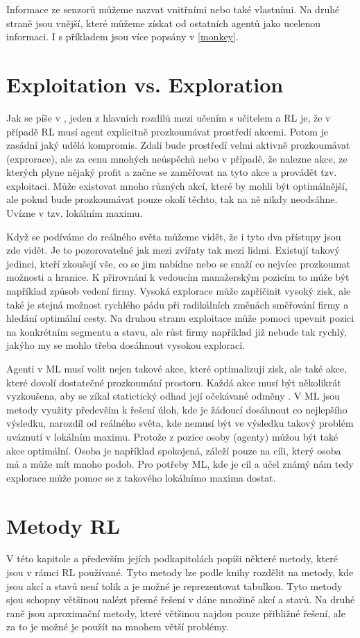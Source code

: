 \documentclass{article}
\begin{document}
Informace ze senzorů můžeme nazvat vnitřními nebo také vlastními. Na druhé straně jsou vnější, které můžeme získat od ostatních agentů jako ucelenou informaci. I s příkladem jsou více popsány v \ref{monkey}.


\section{Exploitation vs. Exploration}
Jak se píše v \cite{kaelbling1996reinforcement}, jeden z hlavních rozdílů mezi učením s učitelem a RL je, že v případě RL musí agent explicitně prozkoumávat prostředí akcemi. Potom je zasádní jaký udělá kompromis. Zdali bude prostředí velmi aktivně prozkoumávat (exprorace), ale za cenu mnohých neúspěchů nebo v případě, že nalezne akce, ze kterých plyne nějaký profit a začne se zaměřovat na tyto akce a provádět tzv. exploitaci. Může existovat mnoho různých akcí, které by mohli být optimálnější, ale pokud bude prozkoumávat pouze okolí těchto, tak na ně nikdy neodsáhne. Uvízne v tzv. lokálním maximu.

Když se podíváme do reálného světa můžeme vidět, že i tyto dva přístupy jsou zde vidět. Je to pozorovatelné jak mezi zvířaty tak mezi lidmi. Existují takový jedinci, kteří zkoušejí vše, co se jim nabídne nebo se snaží co nejvíce prozkoumat možnosti a hranice. K přirovnání k vedoucím manažerským pozicím to může být například způsob vedení firmy. Vysoká explorace může zapříčinit vysoký zisk, ale také je stejná možnost rychlého pádu při radikálních změnách směřování firmy a hledání optimální cesty. Na druhou stranu exploitace může pomoci upevnit pozici na konkrétním segmentu a stavu, ale růst firmy například již nebude tak rychlý, jakýho my se mohlo třeba dosáhnout vysokou explorací.

Agenti v ML musí volit nejen takové akce, které optimalizují zisk, ale také akce, které dovolí dostatečné prozkoumání prostoru. Každá akce musí být několikrát vyzkoušena, aby se zíkal statictický odhad její očekávané odměny \cite{sutton1998introduction}. V ML jsou metody využity především k řešení úloh, kde je žádoucí dosáhnout co nejlepšího výsledku, narozdíl od reálného světa, kde nemusí být ve výsledku takový problém uváznutí v lokálním maximu. Protože z pozice osoby (agenty) můžou být také akce optimální. Osoba je například spokojená, záleží pouze na cíli, který osoba má a může mít mnoho podob. Pro potřeby ML, kde je cíl a učel známý nám tedy explorace může pomoc se z takového lokálnímo maxima dostat. 


\section{Metody RL}
V této kapitole a především jejích podkapitolách popíši některé metody, které jsou v rámci RL používané. Tyto metody lze podle knihy \cite{sutton1998introduction} rozdělit na metody, kde jsou akcí a stavů není tolik a je možné je reprezentovat tabulkou. Tyto metody sjou schopny většinou nalézt přesné řešení v dáne množině akcí a stavů. Na druhé  raně jsou aproximační metody, které většinou najdou pouze přibližné řešení, ale za to je možné je použít na mnohem větší problémy. 
\end{document}
